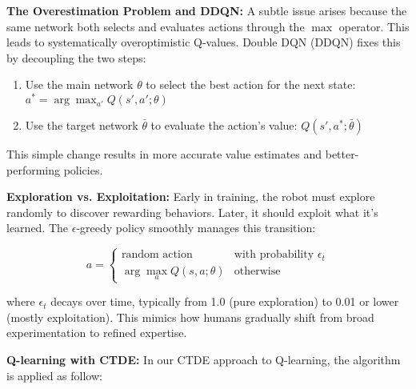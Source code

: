 \documentclass{kththesis}
\begin{document}
\textbf{The Overestimation Problem and DDQN:}
A subtle issue arises because the same network both selects and evaluates actions through the $\max$ operator. This leads to systematically overoptimistic Q-values. Double DQN (DDQN) fixes this by decoupling the two steps:

\begin{enumerate}
    \item Use the main network $\theta$ to select the best action for the next state: $a^* = \arg\max_{a'} Q(s',a';\theta)$
    \item Use the target network $\bar{\theta}$ to evaluate the action's value: $Q(s',a^*;\bar{\theta})$
\end{enumerate}

This simple change results in more accurate value estimates and better-performing policies.

\textbf{Exploration vs. Exploitation:}
Early in training, the robot must explore randomly to discover rewarding behaviors. Later, it should exploit what it's learned. The $\epsilon$-greedy policy smoothly manages this transition:

\begin{equation}
    a = \begin{cases} 
        \text{random action} & \text{with probability } \epsilon_t \\
        \arg\max_{a} Q(s,a;\theta) & \text{otherwise}
    \end{cases}
\end{equation}

where $\epsilon_{t}$ decays over time, typically from 1.0 (pure exploration) to 0.01 or lower (mostly exploitation). This mimics how humans gradually shift from broad experimentation to refined expertise.

\textbf{Q-learning with CTDE:}
In our CTDE approach to Q-learning, the algorithm is applied as follow:
\end{document}
